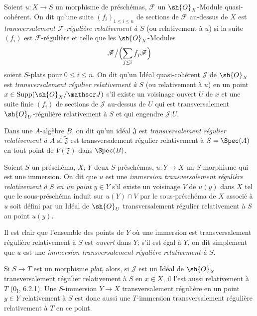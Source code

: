 \begin{definition}[19.2.1]
Soient $u:X\to S$ un morphisme de préschémas, $\mathscr F$ un $\sh{O}_X$-Module quasi-cohérent. On dit qu'une suite $(f_i)_{1\leq i\leq n}$ de sections de $\mathscr F$ au-dessus de $X$ est \emph{transversalement $\mathscr F$-régulière relativement à $S$} (ou relativement à $u$) si la suite $(f_i)$ est $\mathscr F$-régulière et telle que les $\sh{O}_X$-Modules
\[
  \mathscr F\big/\Bigl(\sum_{j\leq i}f_j\mathscr F\Bigr)
\]
soient $S$-plats pour $0\leq i\leq n$. On dit qu'un Idéal quasi-cohérent $\mathscr J$ de $\sh{O}_X$ est \emph{transversalement régulier relativement à $S$} (ou relativement à $u$) en un point $x\in\operatorname{Supp}(\sh{O}_X/\mathscr J)$ s'il existe un voisinage ouvert $U$ de $x$ et une suite finie $(f_i)$ de sections de $\mathscr J$ au-dessus de $U$ qui est transversalement $\sh{O}_U$-régulière relativement à $S$ et qui engendre $\mathscr J|U$.

Dans une $A$-algèbre $B$, on dit qu'un idéal $\mathfrak J$ est \emph{transversalement régulier relativement à $A$} si $\widetilde{\mathfrak J}$ est transversalement régulier relativement à $S=\Spec(A)$ en tout point de $V(\mathfrak J)$ dans $\Spec(B)$.
\end{definition}

\begin{definition}[19.2.2]
Soient $S$ un préschéma, $X$, $Y$ deux $S$-préschémas, $u:Y\to X$ un $S$-morphisme qui est une immersion. On dit que $u$ est une \emph{immersion transversalement régulière relativement à $S$ en un point $y\in Y$} s'il existe un voisinage $V$ de $u(y)$ dans $X$ tel que le sous-préschéma induit sur $u(Y)\cap V$ par le sous-préschéma de $X$ associé à $u$ soit défini par un Idéal de $\sh{O}_U$ transversalement régulier relativement à $S$ au point $u(y)$.

Il est clair que l'ensemble des points de $Y$ où une immersion est transversalement régulière relativement à $S$ est \emph{ouvert} dans $Y$; s'il est égal à $Y$, on dit simplement que $u$ est une \emph{immersion transversalement régulière relativement à $S$}.

Si $S\to T$ est un morphisme \emph{plat}, alors, si $\mathscr J$ est un Idéal de $\sh{O}_X$ transversalement régulier relativement à $S$ en $x\in X$, il l'est aussi relativement à $T$ ($0_{\mathrm I}$, 6.2.1). Une $S$-immersion $Y\to X$ transversalement régulière en un point $y\in Y$ relativement à $S$ est donc aussi une $T$-immersion transversalement régulière relativement à $T$ en ce point.
\end{definition}

